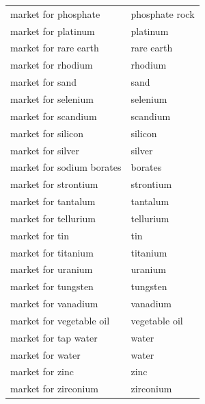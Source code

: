 \documentclass{article}
\begin{document}
\begin{longtable}{ll}
market for phosphate & phosphate rock \\
market for platinum & platinum \\
market for rare earth & rare earth \\
market for rhodium & rhodium \\
market for sand & sand \\
market for selenium & selenium \\
market for scandium & scandium \\
market for silicon & silicon \\
market for silver & silver \\
market for sodium borates & borates \\
market for strontium & strontium \\
market for tantalum & tantalum \\
market for tellurium & tellurium \\
market for tin & tin \\
market for titanium & titanium \\
market for uranium & uranium \\
market for tungsten & tungsten \\
market for vanadium & vanadium \\
market for vegetable oil & vegetable oil \\
market for tap water & water \\
market for water & water \\
market for zinc & zinc \\
market for zirconium & zirconium \\
\bottomrule
\end{longtable}
\end{document}
